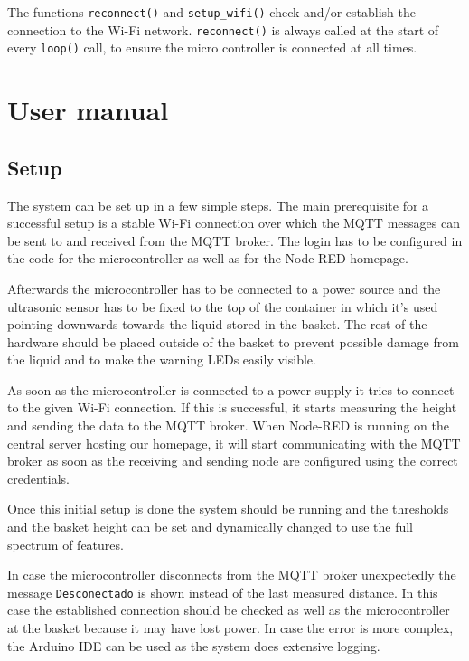 \documentclass{article}
\begin{document}
The functions \verb|reconnect()| and \verb|setup_wifi()| check and/or establish
the connection to the Wi-Fi network. \texttt{reconnect()} is always called at the
start of every \texttt{loop()} call, to ensure the micro controller is connected at all times.

\newpage

\section{User manual}

\subsection{Setup}
The system can be set up in a few simple steps. The main prerequisite for a successful setup is a stable Wi-Fi connection over which the MQTT messages can be sent to and received from the MQTT broker. The login has to be configured in the code for the microcontroller as well as for the Node-RED homepage.\par 
Afterwards the microcontroller has to be connected to a power source and the ultrasonic sensor has to be fixed to the top of the container in which it's used pointing downwards towards the liquid stored in the basket. The rest of the hardware should be placed outside of the basket to prevent possible damage from the liquid and to make the warning LEDs easily visible.\par 
As soon as the microcontroller is connected to a power supply it tries to connect to the given Wi-Fi connection. If this is successful, it starts measuring the height and sending the data to the MQTT broker. When Node-RED is running on the central server hosting our homepage, it will start communicating with the MQTT broker as soon as the receiving and sending node are configured using the correct credentials.\par 
Once this initial setup is done the system should be running and the thresholds and the basket height can be set and dynamically changed to use the full spectrum of features.\par 
In case the microcontroller disconnects from the MQTT broker unexpectedly the message \verb|Desconectado| is shown instead of the last measured distance. In this case the established connection should be checked as well as the microcontroller at the basket because it may have lost power. In case the error is more complex, the Arduino IDE can be used as the system does extensive logging.
\end{document}
